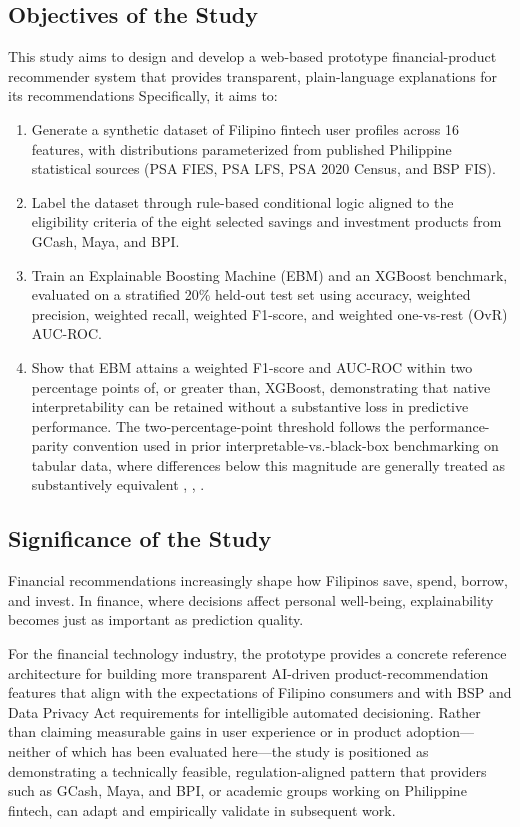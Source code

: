 \documentclass[journal]{./IEEE/IEEEtran}
\begin{document}
\subsection{Objectives of the Study}
This study aims to design and develop a web-based prototype financial-product recommender system that provides transparent, plain-language explanations for its recommendations Specifically, it aims to:

\begin{enumerate}
    \item Generate a synthetic dataset of Filipino fintech user profiles across 16 features, with distributions parameterized from published Philippine statistical sources (PSA FIES, PSA LFS, PSA 2020 Census, and BSP FIS).
    \item Label the dataset through rule-based conditional logic aligned to the eligibility criteria of the eight selected savings and investment products from GCash, Maya, and BPI.
    \item Train an Explainable Boosting Machine (EBM) and an XGBoost benchmark, evaluated on a stratified 20\% held-out test set using accuracy, weighted precision, weighted recall, weighted F1-score, and weighted one-vs-rest (OvR) AUC-ROC.
    \item Show that EBM attains a weighted F1-score and AUC-ROC within two percentage points of, or greater than, XGBoost, demonstrating that native interpretability can be retained without a substantive loss in predictive performance. The two-percentage-point threshold follows the performance-parity convention used in prior interpretable-vs.-black-box benchmarking on tabular data, where differences below this magnitude are generally treated as substantively equivalent \cite{ref15}, \cite{ref50}, \cite{ref51}. 
\end{enumerate}
\subsection{Significance of the Study}
Financial recommendations increasingly shape how Filipinos save, spend, borrow, and invest. In finance, where decisions affect personal well-being, explainability becomes just as important as prediction quality.

For the financial technology industry, the prototype provides a concrete reference architecture for building more transparent AI-driven product-recommendation features that align with the expectations of Filipino consumers and with BSP and Data Privacy Act requirements for intelligible automated decisioning. Rather than claiming measurable gains in user experience or in product adoption---neither of which has been evaluated here---the study is positioned as demonstrating a technically feasible, regulation-aligned pattern that providers such as GCash, Maya, and BPI, or academic groups working on Philippine fintech, can adapt and empirically validate in subsequent work.
\end{document}
